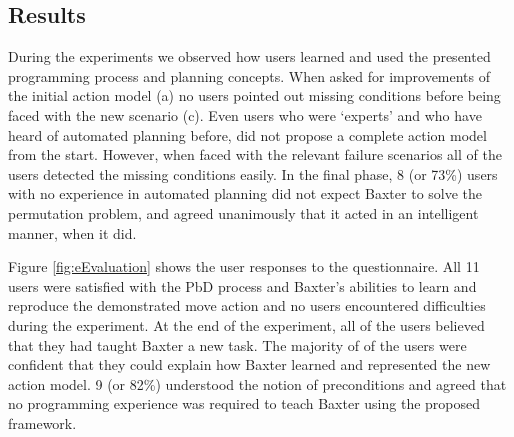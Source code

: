 \subsection{Results}
During the experiments we observed how users learned and used the presented programming process and planning concepts.
When asked for improvements of the initial action model (a) no users pointed out missing conditions before being faced with the new scenario (c).
Even users who were `experts' and who have heard of automated planning before, did not propose a complete action model from the start. 
However, when faced with the relevant failure scenarios all of the users detected the missing conditions easily.
In the final phase, 8 (or 73\%) users with no experience in automated planning did not expect Baxter to solve the permutation problem, and agreed unanimously that it acted in an intelligent manner, when it did. 

Figure \ref{fig:eEvaluation} shows the user responses to the questionnaire.
All 11 users were satisfied with the PbD process and Baxter's abilities to learn and reproduce the demonstrated move action and no users encountered difficulties during the experiment. 
At the end of the experiment, all of the users believed that they had taught Baxter a new task. 
The majority of of the users were confident that they could explain how Baxter learned and represented the new action model.
9 (or 82\%) understood the notion of preconditions and agreed that no programming experience was required to teach Baxter using the proposed framework.



